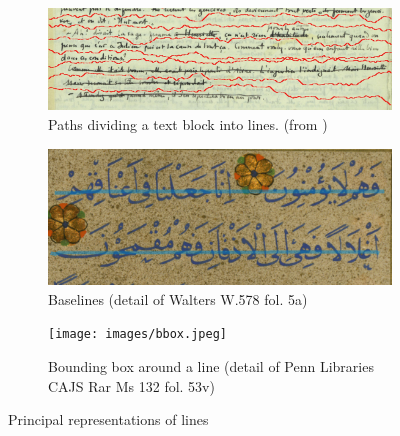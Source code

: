 \begin{figure}
	\centering
	\begin{subfigure}[t]{7cm}
        \centering
        \includegraphics[width=\linewidth]{images/seams.jpg}
	\caption{Paths dividing a text block into lines. (from \cite[figure 5a]{arvanitopoulos2014seam})}
        \end{subfigure}
        \begin{subfigure}[t]{7cm}
        \centering
        \includegraphics[width=\linewidth]{images/bl.jpg}
	\caption{Baselines (detail of Walters W.578 fol. 5a)}
        \end{subfigure}
        \begin{subfigure}[t]{7cm}
        \centering
        \texttt{[image: images/bbox.jpeg]}
	\caption{Bounding box around a line (detail of Penn Libraries CAJS Rar Ms 132 fol. 53v)}
	\label{fig:intro_bbox}
        \end{subfigure}
	\caption{Principal representations of lines}
        \label{fig:intro_para}
\end{figure}

